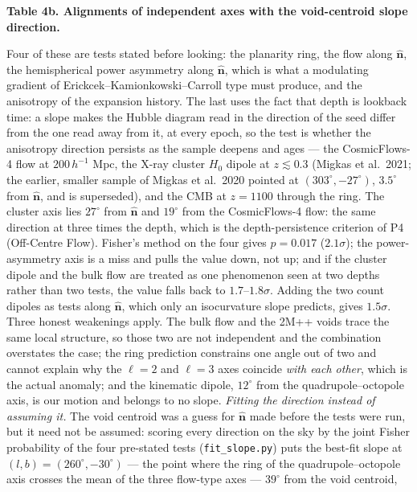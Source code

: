 \documentclass[
  11pt,
]{article}
\begin{document}
\textbf{Table 4b. Alignments of independent axes with the void-centroid
slope direction.}

Four of these are tests stated before looking: the planarity ring, the
flow along \(\hat{\mathbf n}\), the hemispherical power asymmetry along
\(\hat{\mathbf n}\), which is what a modulating gradient of
Erickcek--Kamionkowski--Carroll type must produce, and the anisotropy of
the expansion history. The last uses the fact that depth is lookback
time: a slope makes the Hubble diagram read in the direction of the seed
differ from the one read away from it, at every epoch, so the test is
whether the anisotropy direction persists as the sample deepens and ages
--- the CosmicFlows-4 flow at \(200\,h^{-1}\) Mpc, the X-ray cluster
\(H_0\) dipole at \(z \lesssim 0.3\) (Migkas et al.~2021; the earlier,
smaller sample of Migkas et al.~2020 pointed at
\((303^\circ, -27^\circ)\), \(3.5^\circ\) from \(\hat{\mathbf n}\), and
is superseded), and the CMB at \(z = 1100\) through the ring. The
cluster axis lies \(27^\circ\) from \(\hat{\mathbf n}\) and \(19^\circ\)
from the CosmicFlows-4 flow: the same direction at three times the
depth, which is the depth-persistence criterion of P4 (Off-Centre Flow).
Fisher's method on the four gives \(p = 0.017\) (\(2.1\sigma\)); the
power-asymmetry axis is a miss and pulls the value down, not up; and if
the cluster dipole and the bulk flow are treated as one phenomenon seen
at two depths rather than two tests, the value falls back to
\(1.7\)--\(1.8\sigma\). Adding the two count dipoles as tests along
\(\hat{\mathbf n}\), which only an isocurvature slope predicts, gives
\(1.5\sigma\). Three honest weakenings apply. The bulk flow and the 2M++
voids trace the same local structure, so those two are not independent
and the combination overstates the case; the ring prediction constrains
one angle out of two and cannot explain why the \(\ell = 2\) and
\(\ell = 3\) axes coincide \emph{with each other}, which is the actual
anomaly; and the kinematic dipole, \(12^\circ\) from the
quadrupole--octopole axis, is our motion and belongs to no slope.
\emph{Fitting the direction instead of assuming it.} The void centroid
was a guess for \(\hat{\mathbf n}\) made before the tests were run, but
it need not be assumed: scoring every direction on the sky by the joint
Fisher probability of the four pre-stated tests (\texttt{fit\_slope.py})
puts the best-fit slope at \((l,b) = (260^\circ, -30^\circ)\) --- the
point where the ring of the quadrupole--octopole axis crosses the mean
of the three flow-type axes --- \(39^\circ\) from the void centroid,
\end{document}

